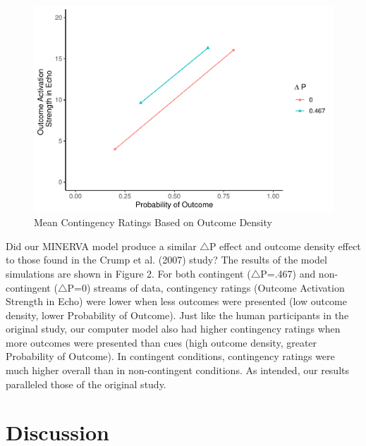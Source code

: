 \documentclass[
  english,
  man,floatsintext]{apa6}
\begin{document}
\begin{figure}
\centering
\includegraphics{thesis_files/figure-latex/unnamed-chunk-4-1.pdf}
\caption{\label{fig:unnamed-chunk-4}Mean Contingency Ratings Based on Outcome Density}
\end{figure}

Did our MINERVA model produce a similar \(\triangle\)P effect and outcome density effect to those found in the Crump et al. (2007) study? The results of the model simulations are shown in Figure 2. For both contingent (\(\triangle\)P=.467) and non-contingent (\(\triangle\)P=0) streams of data, contingency ratings (Outcome Activation Strength in Echo) were lower when less outcomes were presented (low outcome density, lower Probability of Outcome). Just like the human participants in the original study, our computer model also had higher contingency ratings when more outcomes were presented than cues (high outcome density, greater Probability of Outcome). In contingent conditions, contingency ratings were much higher overall than in non-contingent conditions. As intended, our results paralleled those of the original study.

\hypertarget{discussion}{%
\section{Discussion}\label{discussion}}
\end{document}
